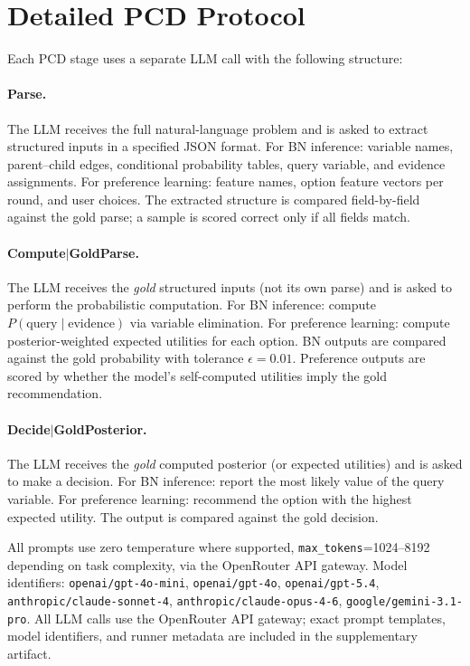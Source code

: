 \documentclass{article}
\begin{document}
\section{Detailed PCD Protocol}
\label{app:pcd_protocol}

Each PCD stage uses a separate LLM call with the following structure:

\paragraph{Parse.}
The LLM receives the full natural-language problem and is asked to extract structured inputs in a specified JSON format.
For BN inference: variable names, parent--child edges, conditional probability tables, query variable, and evidence assignments.
For preference learning: feature names, option feature vectors per round, and user choices.
The extracted structure is compared field-by-field against the gold parse; a sample is scored correct only if all fields match.

\paragraph{Compute$\mid$GoldParse.}
The LLM receives the \emph{gold} structured inputs (not its own parse) and is asked to perform the probabilistic computation.
For BN inference: compute $P(\text{query} \mid \text{evidence})$ via variable elimination.
For preference learning: compute posterior-weighted expected utilities for each option.
BN outputs are compared against the gold probability with tolerance $\epsilon = 0.01$.
Preference outputs are scored by whether the model's self-computed utilities imply the gold recommendation.

\paragraph{Decide$\mid$GoldPosterior.}
The LLM receives the \emph{gold} computed posterior (or expected utilities) and is asked to make a decision.
For BN inference: report the most likely value of the query variable.
For preference learning: recommend the option with the highest expected utility.
The output is compared against the gold decision.

All prompts use zero temperature where supported, \texttt{max\_\allowbreak tokens}=1024--8192 depending on task complexity, via the OpenRouter API gateway.
Model identifiers: \texttt{openai/\allowbreak gpt-4o-mini}, \texttt{openai/\allowbreak gpt-4o}, \texttt{openai/\allowbreak gpt-5.4}, \texttt{anthropic/\allowbreak claude-sonnet-4}, \texttt{anthropic/\allowbreak claude-opus-4-6}, \texttt{google/\allowbreak gemini-3.1-pro}.
All LLM calls use the OpenRouter API gateway; exact prompt templates, model identifiers, and runner metadata are included in the supplementary artifact.
\end{document}

